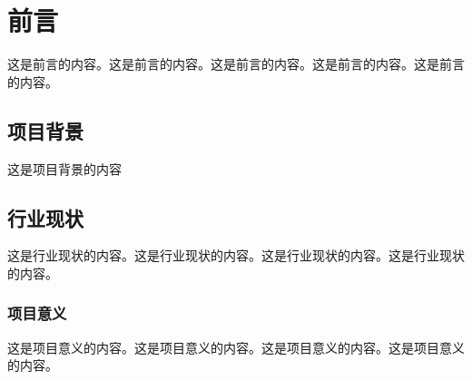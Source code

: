 \section{前言}
这是前言的内容。这是前言的内容。这是前言的内容。这是前言的内容。这是前言的内容。
\subsection{项目背景}
这是项目背景的内容
\subsection{行业现状}
这是行业现状的内容。这是行业现状的内容。这是行业现状的内容。这是行业现状的内容。
\subsubsection{项目意义}
这是项目意义的内容。这是项目意义的内容。这是项目意义的内容。这是项目意义的内容。